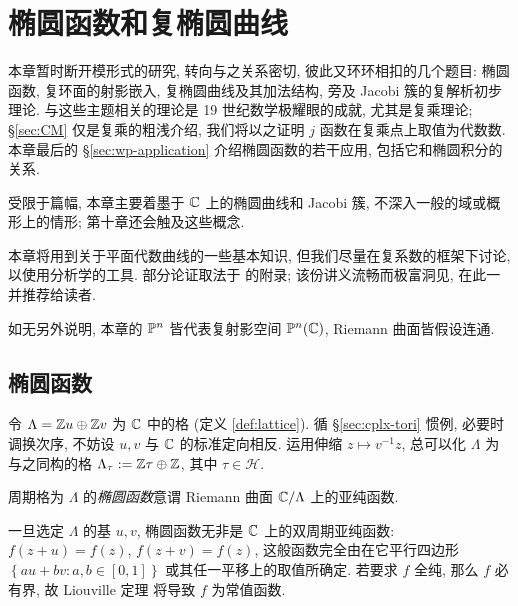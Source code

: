 
\chapter{椭圆函数和复椭圆曲线}
本章暂时断开模形式的研究, 转向与之关系密切, 彼此又环环相扣的几个题目: 椭圆函数, 复环面的射影嵌入, 复椭圆曲线及其加法结构, 旁及 Jacobi 簇的复解析初步理论. 与这些主题相关的理论是 19 世纪数学极耀眼的成就, 尤其是复乘理论; \S\ref{sec:CM} 仅是复乘的粗浅介绍, 我们将以之证明 $j$ 函数在复乘点上取值为代数数. 本章最后的 \S\ref{sec:wp-application} 介绍椭圆函数的若干应用, 包括它和椭圆积分的关系.

受限于篇幅, 本章主要着墨于 $\mathbb{C}$ 上的椭圆曲线和 Jacobi 簇, 不深入一般的域或概形上的情形; 第十章还会触及这些概念.

本章将用到关于平面代数曲线的一些基本知识, 但我们尽量在复系数的框架下讨论, 以使用分析学的工具. 部分论证取法于 \cite{Mum99} 的附录; 该份讲义流畅而极富洞见, 在此一并推荐给读者.

如无另外说明, 本章的 $\mathbb{P}^n$ 皆代表复射影空间 $\mathbb{P}^n(\mathbb{C})$, Riemann 曲面皆假设连通.

\section{椭圆函数}\label{sec:elliptic-function}
令 $\Lambda = \mathbb{Z} u \oplus \mathbb{Z} v$ 为 $\mathbb{C}$ 中的格 (定义 \ref{def:lattice}). 循 \S\ref{sec:cplx-tori} 惯例, 必要时调换次序, 不妨设 $u, v$ 与 $\mathbb{C}$ 的标准定向相反. 运用伸缩 $z \mapsto v^{-1}z$, 总可以化 $\Lambda$ 为与之同构的格 $\Lambda_\tau := \mathbb{Z} \tau \oplus \mathbb{Z}$, 其中 $\tau \in \mathcal{H}$.

\begin{definition}
	周期格为 $\Lambda$ 的\emph{椭圆函数}意谓 Riemann 曲面 $\mathbb{C}/\Lambda$ 上的亚纯函数.
\end{definition}

一旦选定 $\Lambda$ 的基 $u,v$, 椭圆函数无非是 $\mathbb{C}$ 上的双周期亚纯函数: $f(z + u) = f(z)$, $f(z + v) = f(z)$, 这般函数完全由在它平行四边形 $\left\{au + bv: a,b \in [0,1] \right\}$ 或其任一平移上的取值所确定. 若要求 $f$ 全纯, 那么 $f$ 必有界, 故 Liouville 定理 \cite[\S 3.5, 定理 3]{TW06} 将导致 $f$ 为常值函数.

